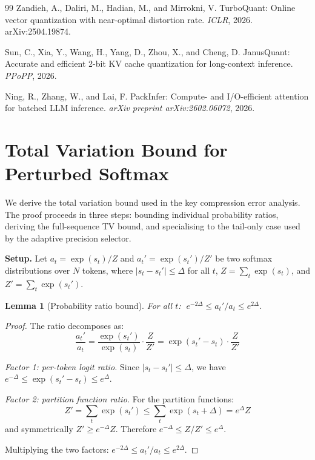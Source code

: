 \documentclass[11pt,a4paper]{article}
\newtheorem{lemma}[theorem]{Lemma}
\theoremstyle{definition}
\theoremstyle{remark}
\begin{document}
\begin{thebibliography}{99}
Zandieh, A., Daliri, M., Hadian, M., and Mirrokni, V.
\newblock TurboQuant: Online vector quantization with near-optimal distortion rate.
\newblock \emph{ICLR}, 2026.
\newblock arXiv:2504.19874.

Sun, C., Xia, Y., Wang, H., Yang, D., Zhou, X., and Cheng, D.
\newblock JanusQuant: Accurate and efficient 2-bit KV cache quantization for long-context inference.
\newblock \emph{PPoPP}, 2026.

Ning, R., Zhang, W., and Lai, F.
\newblock PackInfer: Compute- and I/O-efficient attention for batched LLM inference.
\newblock \emph{arXiv preprint arXiv:2602.06072}, 2026.

\end{thebibliography}

\appendix
\section{Total Variation Bound for Perturbed Softmax}
\label{app:tv_proof}

We derive the total variation bound used in the key compression error analysis.  The proof proceeds in three steps: bounding individual probability ratios, deriving the full-sequence TV bound, and specialising to the tail-only case used by the adaptive precision selector.

\textbf{Setup.}  Let $a_t = \exp(s_t)/Z$ and $a_t' = \exp(s_t')/Z'$ be two softmax distributions over $N$ tokens, where $|s_t - s_t'| \leq \Delta$ for all $t$, $Z = \sum_t \exp(s_t)$, and $Z' = \sum_t \exp(s_t')$.

\begin{lemma}[Probability ratio bound]
\label{lem:ratio}
For all $t$: $\; e^{-2\Delta} \leq a_t'/a_t \leq e^{2\Delta}$.
\end{lemma}

\begin{proof}
The ratio decomposes as:
\[
  \frac{a_t'}{a_t} = \frac{\exp(s_t')}{\exp(s_t)} \cdot \frac{Z}{Z'} = \exp(s_t' - s_t) \cdot \frac{Z}{Z'}
\]

\emph{Factor 1: per-token logit ratio.}  Since $|s_t - s_t'| \leq \Delta$, we have $e^{-\Delta} \leq \exp(s_t' - s_t) \leq e^{\Delta}$.

\emph{Factor 2: partition function ratio.}  For the partition functions:
\[
  Z' = \sum_t \exp(s_t') \leq \sum_t \exp(s_t + \Delta) = e^{\Delta} Z
\]
and symmetrically $Z' \geq e^{-\Delta} Z$.  Therefore $e^{-\Delta} \leq Z/Z' \leq e^{\Delta}$.

Multiplying the two factors: $e^{-2\Delta} \leq a_t'/a_t \leq e^{2\Delta}$.
\end{proof}
\end{document}
